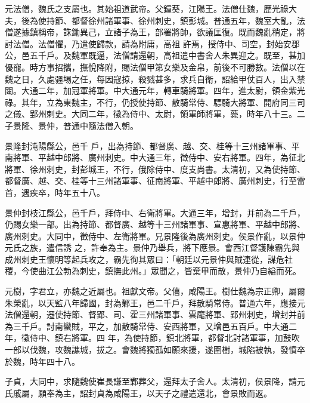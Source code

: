 
\begin{pinyinscope}

 元法僧，魏氏之支屬也。其始祖道武帝。父鐘葵，江陽王。法僧仕魏，歷光祿大夫，後為使持節、都督徐州諸軍事、徐州刺史，鎮彭城。普通五年，魏室大亂，法僧遂據鎮稱帝，誅鋤異己，立諸子為王，部署將帥，欲議匡復。既而魏亂稍定，將討法僧。法僧懼，乃遣使歸款，請為附庸，高祖
 許焉，授侍中、司空，封始安郡公，邑五千戶。及魏軍既逼，法僧請還朝，高祖遣中書舍人朱異迎之。既至，甚加優寵。時方事招攜，撫悅降附，賜法僧甲第女樂及金帛，前後不可勝數。法僧以在魏之日，久處疆埸之任，每因寇掠，殺戮甚多，求兵自衛，詔給甲仗百人，出入禁闥。大通二年，加冠軍將軍。中大通元年，轉車騎將軍。四年，進太尉，領金紫光祿。其年，立為東魏主，不行，仍授使持節、散騎常侍、驃騎大將軍、開府同三司之儀、郢州刺史。大同二年，徵為侍中、太尉，領軍師將軍，薨，時年八十三。二子景隆、景仲，普通中隨法僧入朝。



 景隆封沌陽縣公，邑千
 戶，出為持節、都督廣、越、交、桂等十三州諸軍事、平南將軍、平越中郎將、廣州刺史。中大通三年，徵侍中、安右將軍。四年，為征北將軍、徐州刺史，封彭城王，不行，俄除侍中、度支尚書。太清初，又為使持節、都督廣、越、交、桂等十三州諸軍事、征南將軍、平越中郎將、廣州刺史，行至雷首，遇疾卒，時年五十八。



 景仲封枝江縣公，邑千戶，拜侍中、右衛將軍。大通三年，增封，并前為二千戶，仍賜女樂一部。出為持節、都督廣、越等十三州諸軍事、宣惠將軍、平越中郎將、廣州刺史。大同中，徵侍中、左衛將軍。兄景隆後為廣州刺史。侯景作亂，以景仲元氏之族，遣信誘
 之，許奉為主。景仲乃舉兵，將下應景。會西江督護陳霸先與成州刺史王懷明等起兵攻之，霸先徇其眾曰：「朝廷以元景仲與賊連從，謀危社稷，今使曲江公勃為刺史，鎮撫此州。」眾聞之，皆棄甲而散，景仲乃自縊而死。



 元樹，字君立，亦魏之近屬也。祖獻文帝。父僖，咸陽王。樹仕魏為宗正卿，屬爾朱榮亂，以天監八年歸國，封為鄴王，邑二千戶，拜散騎常侍。普通六年，應接元法僧還朝，遷使持節、督郢、司、霍三州諸軍事、雲麾將軍、郢州刺史，增封并前為三千戶。討南蠻賊，平之，加散騎常侍、安西將軍，又增邑五百戶。中大通二年，徵侍中、鎮右將軍。四
 年，為使持節，鎮北將軍，都督北討諸軍事，加鼓吹一部以伐魏，攻魏譙城，拔之。會魏將獨孤如願來援，遂圍樹，城陷被執，發憤卒於魏，時年四十八。



 子貞，大同中，求隨魏使崔長謙至鄴葬父，還拜太子舍人。太清初，侯景降，請元氏戚屬，願奉為主，詔封貞為咸陽王，以天子之禮遣還北，會景敗而返。




\end{pinyinscope}
